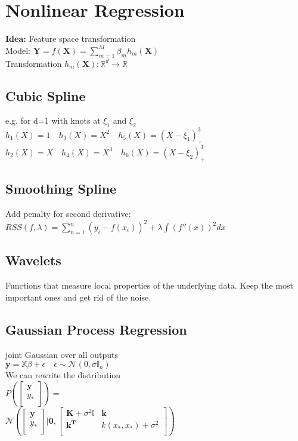 \section*{Nonlinear Regression}
\textbf{Idea:} Feature space transformation\\
Model: $\mathbf{Y}=f(\mathbf{X})=\sum_{m=1}^M\beta_m h_m(\mathbf{X})$\\
Transformation $h_m(\mathbf{X}):\mathbb{R}^d \rightarrow \mathbb{R}$


 \subsection*{Cubic Spline}
 e.g. for d=1 with knots at $\xi_1$ and $\xi_2$\\
 $h_1(X){=}1\quad h_3(X){=}X^2\quad h_5(X){=}(X{-}\xi_1)^3_+$
 $h_2(X){=}X\quad h_4(X){=}X^3\quad h_6(X){=}(X{-}\xi_2)^3_+$

 \subsection*{Smoothing Spline}
 Add penalty for second derivative: 
 $RSS(f, \lambda) = \sum_{n=1}^n (y_i-f(x_i))^2 + \lambda\int (f''(x))^2 dx$
\subsection*{Wavelets}
 Functions that measure local properties of the underlying data. Keep the most important ones and get rid of the noise.

\subsection*{Gaussian Process Regression}
joint Gaussian over all outputs\\
$\mathbf{y}=\mathbb{X}\beta+\epsilon \quad \epsilon\sim \mathcal{N}(0,\sigma\mathbb{I}_n)$\\
We can rewrite the distribution\\
$P(\begin{bmatrix}
\mathbf{y}\\
y_*\\
\end{bmatrix}){=}$\\$\mathcal{N}(\begin{bmatrix}
\mathbf{y}\\
y_*\\
\end{bmatrix}|\mathbf{0},\begin{bmatrix}
\mathbf{K}+\sigma^2\mathbb{I} & \mathbf{k} \\
\mathbf{k^T} & k(x_*,x_*) + \sigma^2\\
\end{bmatrix})$\\

